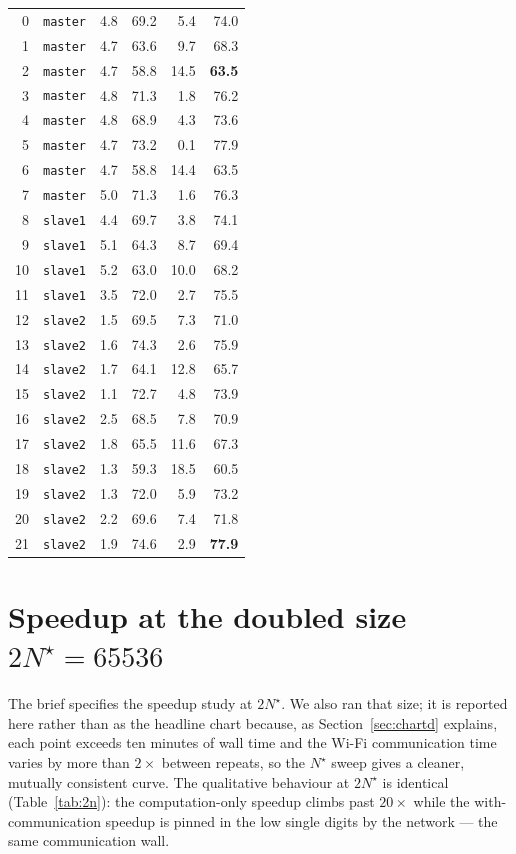 \documentclass[11pt,a4paper]{article}
\newcommand{\code}[1]{\texttt{#1}}
\begin{document}
\begin{table}[H]
\begin{tabular}{@{}rlrrrr@{}}
0 & \code{master} & 4.8 & 69.2 & 5.4 & 74.0 \\
1 & \code{master} & 4.7 & 63.6 & 9.7 & 68.3 \\
2 & \code{master} & 4.7 & 58.8 & 14.5 & \textbf{63.5} \\
3 & \code{master} & 4.8 & 71.3 & 1.8 & 76.2 \\
4 & \code{master} & 4.8 & 68.9 & 4.3 & 73.6 \\
5 & \code{master} & 4.7 & 73.2 & 0.1 & 77.9 \\
6 & \code{master} & 4.7 & 58.8 & 14.4 & 63.5 \\
7 & \code{master} & 5.0 & 71.3 & 1.6 & 76.3 \\
8 & \code{slave1} & 4.4 & 69.7 & 3.8 & 74.1 \\
9 & \code{slave1} & 5.1 & 64.3 & 8.7 & 69.4 \\
10 & \code{slave1} & 5.2 & 63.0 & 10.0 & 68.2 \\
11 & \code{slave1} & 3.5 & 72.0 & 2.7 & 75.5 \\
12 & \code{slave2} & 1.5 & 69.5 & 7.3 & 71.0 \\
13 & \code{slave2} & 1.6 & 74.3 & 2.6 & 75.9 \\
14 & \code{slave2} & 1.7 & 64.1 & 12.8 & 65.7 \\
15 & \code{slave2} & 1.1 & 72.7 & 4.8 & 73.9 \\
16 & \code{slave2} & 2.5 & 68.5 & 7.8 & 70.9 \\
17 & \code{slave2} & 1.8 & 65.5 & 11.6 & 67.3 \\
18 & \code{slave2} & 1.3 & 59.3 & 18.5 & 60.5 \\
19 & \code{slave2} & 1.3 & 72.0 & 5.9 & 73.2 \\
20 & \code{slave2} & 2.2 & 69.6 & 7.4 & 71.8 \\
21 & \code{slave2} & 1.9 & 74.6 & 2.9 & \textbf{77.9} \\
\bottomrule
\end{tabular}
\label{tab:raw-tensor}
\end{table}

\section{Speedup at the doubled size $2N^{\star}=65536$}
\label{app:2n}
The brief specifies the speedup study at $2N^{\star}$. We also ran that size; it is
reported here rather than as the headline chart because, as
Section~\ref{sec:chartd} explains, each point exceeds ten minutes of wall time and
the Wi-Fi communication time varies by more than $2\times$ between repeats, so the
$N^{\star}$ sweep gives a cleaner, mutually consistent curve. The qualitative
behaviour at $2N^{\star}$ is identical (Table~\ref{tab:2n}): the computation-only
speedup climbs past $20\times$ while the with-communication speedup is pinned in the
low single digits by the network --- the same communication wall.
\end{document}
